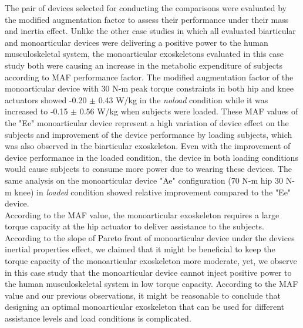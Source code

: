 \documentclass[10pt,letterpaper]{article}
\begin{document}
The pair of devices selected for conducting the comparisons were evaluated by the modified augmentation factor to assess their performance under their mass and inertia effect. Unlike the other case studies in which all evaluated biarticular and monoarticular devices were delivering a positive power to the human musculoskeletal system, the monoarticular exoskeletons evaluated in this case study both were causing an increase in the metabolic expenditure of subjects according to MAF performance factor. The modified augmentation factor of the monoarticular device with 30 N-m peak torque constraints in both hip and knee actuators showed -0.20 $\pm$ 0.43 W/kg in the {\it noload} condition while it was increased to -0.15 $\pm$ 0.56 W/kg when subjects were loaded. These MAF values of the "Ee" monoarticular device represent a high variation of device effect on the subjects and improvement of the device performance by loading subjects, which was also observed in the biarticular exoskeleton. Even with the improvement of device performance in the loaded condition, the device in both loading conditions would cause subjects to consume more power due to wearing these devices. The same analysis on the monoarticular device "Ae" configuration (70 N-m hip 30 N-m knee) in {\it loaded} condition showed relative improvement compared to the "Ee" device.\\
According to the MAF value, the monoarticular exoskeleton requires a large torque capacity at the hip actuator to deliver assistance to the subjects. According to the slope of Pareto front of monoarticular device under the devices inertial properties effect, we claimed that it might be beneficial to keep the torque capacity of the monoarticular exoskeleton more moderate, yet, we observe in this case study that the monoarticular device cannot inject positive power to the human musculoskeletal system in low torque capacity. According to the MAF value and our previous observations, it might be reasonable to conclude that designing an optimal monoarticular exoskeleton that can be used for different assistance levels and load conditions is complicated.\\
\end{document}
